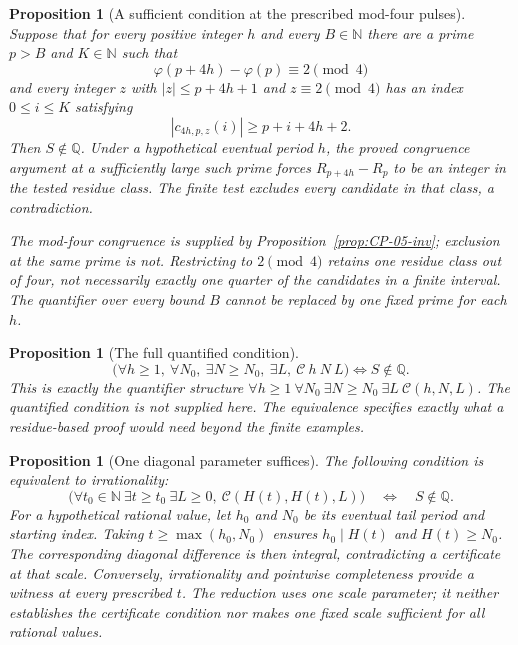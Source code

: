 \documentclass[11pt]{article}
\theoremstyle{plain}
\newtheorem{prop}[thm]{Proposition}
\theoremstyle{definition}
\theoremstyle{remark}
\begin{document}
\begin{prop}[A sufficient condition at the prescribed mod-four pulses]\label{prop:CP-07}
Suppose that for every positive integer $h$ and every $B\in\mathbb N$
there are a prime $p>B$ and $K\in\mathbb N$ such that
\[
 \varphi(p+4h)-\varphi(p)\equiv2\pmod4
\]
and every integer $z$ with $|z|\le p+4h+1$ and $z\equiv2\pmod4$
has an index $0\le i\le K$ satisfying
\[
 |c_{4h,p,z}(i)|\ge p+i+4h+2.
\]
Then $S\notin\mathbb Q$. Under a hypothetical eventual period $h$,
the proved congruence argument at a sufficiently large such prime
forces $R_{p+4h}-R_p$ to be an integer in the tested residue class.
The finite test excludes every candidate in that class, a contradiction.

The mod-four congruence is supplied by
Proposition~\ref{prop:CP-05-inv}; exclusion at the same prime is not.
Restricting to $2\pmod4$ retains one residue class out of four, not
necessarily exactly one quarter of the candidates in a finite interval.
The quantifier over every bound $B$ cannot be replaced by one fixed
prime for each $h$.

\end{prop}

\begin{prop}[The full quantified condition]\label{prop:A10}
\[
\big(\forall h\ge 1,\ \forall N_0,\ \exists N\ge N_0,\ \exists L,\ \mathcal{C}\ h\ N\ L\big)
\iff S\notin\mathbb Q.
\]
This is exactly the quantifier structure $\forall h\ge1\ \forall N_0\ \exists N\ge N_0\ \exists L\ \mathcal{C}(h,N,L)$.
The quantified condition is not supplied here. The equivalence specifies
exactly what a residue-based proof would need beyond the finite examples.
\end{prop}

\begin{prop}[One diagonal parameter suffices]\label{prop:B3}
The following condition is equivalent to irrationality:
\[
 \bigl(\forall t_0\in\mathbb N\ \exists t\ge t_0\ \exists L\ge0,
       \ \mathcal C(H(t),H(t),L)\bigr)
 \quad\Longleftrightarrow\quad S\notin\mathbb Q.
\]
For a hypothetical rational value, let $h_0$ and $N_0$ be its eventual
tail period and starting index. Taking $t\ge\max(h_0,N_0)$ ensures
$h_0\mid H(t)$ and $H(t)\ge N_0$. The corresponding diagonal difference
is then integral, contradicting a certificate at that scale.
Conversely, irrationality and pointwise completeness provide a witness
at every prescribed $t$. The reduction uses one scale parameter; it
neither establishes the certificate condition nor makes one fixed scale
sufficient for all rational values.
\end{prop}
\end{document}
